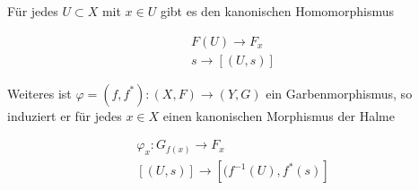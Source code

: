 \documentclass{report}
\begin{document}
Für jedes $U \subset X$ mit $x \in U$ gibt es den kanonischen Homomorphismus

\begin{align}
    F(U) \to F_x \\
    s \to [(U,s)]
\end{align}

Weiteres ist $\varphi=(f,f^*): (X,F) \to (Y,G)$ ein Garbenmorphismus, so induziert er für jedes $x \in X$ einen kanonischen Morphismus der Halme

\begin{align}
    \varphi_x : G_{f(x)} \to F_x \\
    [(U,s)] \to [(f^{-1}(U), f^*(s)]
\end{align}



\end{document}
